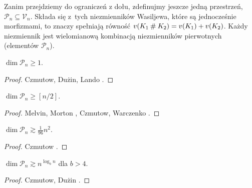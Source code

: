 Zanim przejdziemy do ograniczeń z dołu, zdefinujmy jeszcze jedną przestrzeń, $\mathcal P_n \subseteq \mathcal V_n$.
Składa się z~tych niezmienników Wasiljewa, które są jednocześnie morfizmami, to znaczy spełniają równość $v(K_1 \mathbin{\#} K_2) = v(K_1) + v(K_2)$.
Każdy niezmiennik jest wielomianową kombinacją niezmienników pierwotnych (elementów $\mathcal P_n$).

\begin{proposition}
    $\dim \mathcal P_n \ge 1$.
\end{proposition}

\begin{proof}
%
%
%
    Czmutow, Dużin, Lando \cite{duzhin1994}.
\end{proof}

\begin{proposition}
    $\dim \mathcal P_n \ge [n/2]$.
\end{proposition}

\begin{proof}
%
%
%
%
    Melvin, Morton \cite{melvin1995}, Czmutow, Warczenko \cite{varchenko1997}.
\end{proof}

\begin{proposition}
    $\dim \mathcal P_n \gtrsim \frac{1}{96} n^2$.
\end{proposition}

\begin{proof}
%
    Czmutow \cite{duzhin1996}.
\end{proof}

\begin{proposition}
    $\dim \mathcal P_n \gtrsim n^{\log_b n}$ dla $b > 4$.
\end{proposition}

\begin{proof}
%
%
    Czmutow, Dużin \cite{duzhin1999}.
\end{proof}

